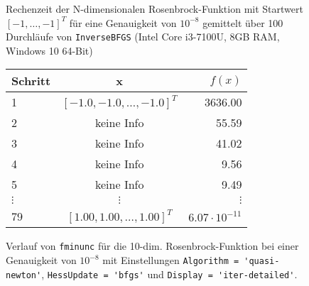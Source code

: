 \documentclass[a4paper, 12pt]{report}
\begin{document}
\begin{figure}[H]
  \centering
\caption{Rechenzeit der N-dimensionalen Rosenbrock-Funktion mit Startwert $[-1, \ldots, -1]^T$ für
  eine Genauigkeit von $10^{-8}$ gemittelt über 100 Durchläufe von \lstinline[basicstyle=\ttfamily\color{black}]|InverseBFGS|
  (Intel Core i3-7100U, 8GB RAM, Windows 10 64-Bit)}
\end{figure}

\begin{figure}[H]
  \centering
  \def\arraystretch{1.25}
  \begin{tabular}{l|c|r}
    \hline
    \textbf{Schritt} & \textbf{x} & \textbf{$f(x)$}\\
    \hline
    1 & $[-1.0, -1.0, \ldots, -1.0]^T$ & 3636.00\\
    2 & keine Info & 55.59\\
    3 & keine Info & 41.02\\
    4 & keine Info & 9.56\\
    5 & keine Info & 9.49\\
    $\vdots$ & $\vdots$ & $\vdots$\\
    79 & $[1.00, 1.00, \ldots, 1.00]^T$ & $6.07\cdot 10^{-11}$\\
    \hline
  \end{tabular}
  \caption{Verlauf von \lstinline[basicstyle=\ttfamily\color{black}]|fminunc| für die 10-dim. Rosenbrock-Funktion bei einer Genauigkeit von
          $10^{-8}$ mit Einstellungen \lstinline[basicstyle=\ttfamily\color{black}]|Algorithm = 'quasi-newton'|,
          \lstinline[basicstyle=\ttfamily\color{black}]|HessUpdate = 'bfgs'| und
          \lstinline[basicstyle=\ttfamily\color{black}]|Display = 'iter-detailed'|.}
\end{figure}
\end{document}
